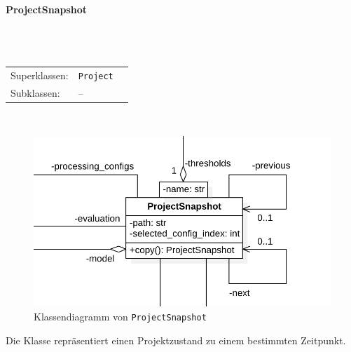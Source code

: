 \documentclass{article}
\newcommand{\classheader}[2][]{\paragraph{#2}
\mbox{}\textit{#1}\\\\}
\begin{document}
\newpage
\classheader{ProjectSnapshot}\label{cls:ProjectSnapshot}
\begin{tabular}{lll}
 Superklassen: & \texttt{Project}\\
 Subklassen: & --
\end{tabular}\\
\begin{figure}[H]%
    \centering
    \includegraphics[width=13cm]{entwurf/Entwurf_dokument/img/cls/model/ProjectSnapshot.png}
    \caption{Klassendiagramm von \texttt{ProjectSnapshot}}
\end{figure}

Die Klasse repräsentiert einen Projektzustand zu einem bestimmten Zeitpunkt.
\\\\
\end{document}
